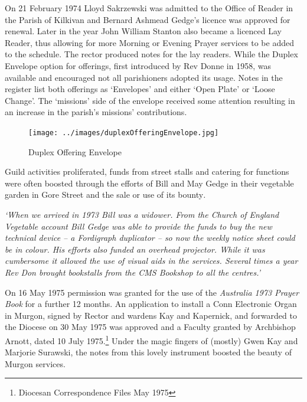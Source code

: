 On 21 February 1974 Lloyd Sakrzewski was admitted to the Office of Reader in the Parish of Kilkivan and Bernard Ashmead Gedge's licence was approved for renewal. Later in the year John William Stanton also became a licenced Lay Reader, thus allowing for more Morning or Evening Prayer services to be added to the schedule. The rector produced notes for the lay readers. While the Duplex Envelope option for offerings, first introduced by Rev Donne in 1958, was available and encouraged not all parishioners adopted its usage. Notes in the register list both offerings as `Envelopes' and either `Open Plate' or `Loose Change'. The `missions' side of the envelope received some attention resulting in an increase in the parish's missions' contributions.









\begin{figure}
\begin{center}
\texttt{[image: ../images/duplexOfferingEnvelope.jpg]}
\caption{Duplex Offering Envelope}
\end{center}
\end{figure}




Guild activities proliferated, funds from street stalls and catering for functions were often boosted through the efforts of Bill and May Gedge in their vegetable garden in Gore Street and the sale or use of its bounty\emph{.}



\emph{`When we arrived in 1973 Bill was a widower. From the Church of England Vegetable account Bill Gedge was able to provide the funds to buy the new technical device -- a Fordigraph duplicator -- so now the weekly notice sheet could be in colour. His efforts also funded an overhead projector. While it was cumbersome it allowed the use of visual aids in the services. Several times a year Rev Don brought bookstalls from the CMS Bookshop to all the centres.'}



On 16 May 1975 permission was granted for the use of the \emph{Australia 1973 Prayer Book} for a further 12 months. An application to install a Conn Electronic Organ in Murgon, signed by Rector and wardens Kay and Kapernick, and forwarded to the Diocese on 30 May 1975 was approved and a Faculty granted by Archbishop Arnott, dated 10 July 1975.\footnote{Diocesan Correspondence Files May 1975} Under the magic fingers of (mostly) Gwen Kay and Marjorie Surawski, the notes from this lovely instrument boosted the beauty of Murgon services.



